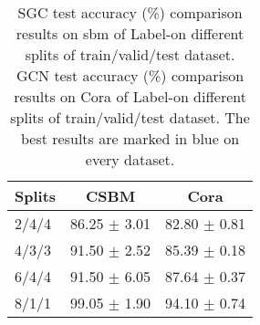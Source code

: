 \begin{wraptable}{r}{0.7\textwidth}
\small
\vspace{-1em}
\centering
\caption{
SGC test accuracy (\%) comparison results on sbm of Label-\ourst on different splits of train/valid/test dataset. 
GCN test accuracy (\%) comparison results on Cora of Label-\ourst on different splits of train/valid/test dataset.
The best results are marked in blue on every dataset.}
\begin{tabular}{lcc}
\toprule
 Splits & CSBM  & Cora   \\
\midrule



  2/4/4 & 86.25 {\footnotesize $\pm$ 3.01} & 82.80 {\footnotesize $\pm$ 0.81}\\
  4/3/3 & 91.50 {\footnotesize $\pm$ 2.52} & 85.39 {\footnotesize $\pm$ 0.18 }\\
  6/4/4 & 91.50 {\footnotesize $\pm$ 6.05} & 87.64 {\footnotesize $\pm$ 0.37 }\\
  8/1/1 & \cellcolor{best}99.05 {\footnotesize $\pm$ 1.90} & \cellcolor{best} 94.10 {\footnotesize $\pm$ 0.74} \\

\bottomrule
\end{tabular}
\label{table: ablation}
\end{wraptable}





